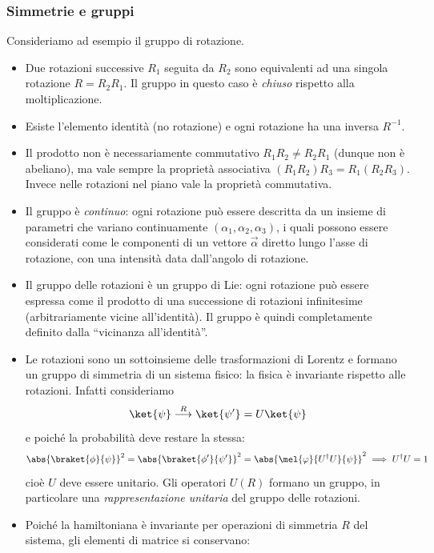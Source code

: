 \subsubsection{Simmetrie e gruppi}
Consideriamo ad esempio il gruppo di rotazione.
\begin{itemize}
    \item Due rotazioni successive $R_1$ seguita da $R_2$ sono equivalenti ad una singola rotazione $R=R_2R_1$. Il gruppo in questo caso è \textit{chiuso} rispetto alla moltiplicazione.
    \item Esiste l'elemento identità (no rotazione) e ogni rotazione ha una inversa $R^{-1}$.
    \item Il prodotto non è necessariamente commutativo $R_1R_2\neq R_2R_1$ (dunque non è abeliano), ma vale sempre la proprietà associativa $(R_1R_2)R_3=R_1(R_2R_3)$. Invece nelle rotazioni nel piano vale la proprietà commutativa.
    \item Il gruppo è \textit{continuo}: ogni rotazione può essere descritta da un insieme di parametri che variano continuamente $(\alpha_1,\alpha_2,\alpha_3)$, i quali possono essere considerati come le componenti di un vettore $\vec \alpha$ diretto lungo l'asse di rotazione, con una intensità data dall'angolo di rotazione.
    \item Il gruppo delle rotazioni è un gruppo di Lie: ogni rotazione può essere espressa come il prodotto di una successione di rotazioni infinitesime (arbitrariamente vicine all'identità). Il gruppo è quindi completamente definito dalla “vicinanza all'identità”.
    \item Le rotazioni sono un sottoinsieme delle trasformazioni di Lorentz e formano un gruppo di simmetria di un sistema fisico: la fisica è invariante rispetto alle rotazioni. Infatti consideriamo
    \begin{equation*}
        \ket{\psi}\overset{R}{\longrightarrow}\ket{\psi'}=U\ket{\psi}
    \end{equation*}
    e poiché la probabilità deve restare la stessa:
    \begin{equation*}
        \abs{\braket{\phi}{\psi}}^2=\abs{\braket{\phi'}{\psi'}}^2=\abs{\mel{\varphi}{U^\dag U}{\psi}}^2\implies U^\dag U=1
    \end{equation*}
    cioè $U$ deve essere unitario. Gli operatori $U(R)$ formano un gruppo, in particolare una \textit{rappresentazione unitaria} del gruppo delle rotazioni.
    \item Poiché la hamiltoniana è invariante per operazioni di simmetria $R$ del sistema, gli elementi di matrice si conservano:

\end{itemize}
